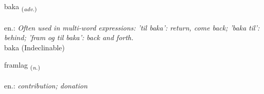 \documentclass[frontgrid, backgrid]{flacards}\usepackage[]{graphicx}\usepackage[]{xcolor}
\begin{document}

\renewcommand{\flhead}{\vskip5pt \fboxsep=0pt {\small\bfseries\footnotesize Atviksorð | Adverb}}
\renewcommand{\fcfoot}{\vskip5pt \fboxsep=0pt \hspace{2pt}{\small\bfseries\footnotesize 1K}}

\renewcommand{\blhead}{\vskip5pt {\small\bfseries\footnotesize Atviksorð | Adverb }}
\renewcommand{\bcfoot}{\vskip5pt \hspace{2pt}{\small\bfseries\footnotesize 1K}}


{baka \small{\textsubscript{(\textit{adv.})}} \\[1ex]
\textphonetic{[paːka]} \\
en.: \emph{Often used in multi-word expressions: 'til baka': return, come back; 'baka til': behind; 'fram og til baka': back and forth.} \\  [2ex]
baka (Indeclinable)}

\renewcommand{\flhead}{\vskip5pt \fboxsep=0pt {\small\bfseries\footnotesize Nafnorð | Noun}}
\renewcommand{\fcfoot}{\vskip5pt \fboxsep=0pt \hspace{2pt}{\small\bfseries\footnotesize 1K}}

\renewcommand{\blhead}{\vskip5pt {\small\bfseries\footnotesize Nafnorð | Noun }}
\renewcommand{\bcfoot}{\vskip5pt \hspace{2pt}{\small\bfseries\footnotesize 1K}}


{framlag \small{\textsubscript{(\textit{n.})}} \\[1ex] %
\textphonetic{[framlaɣ]} \\
en.: \emph{contribution; donation} \\  [2ex]
\renewcommand*{\arraystretch}{0.8}
}
\end{document}
